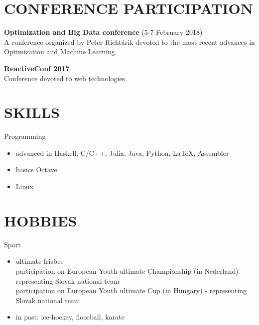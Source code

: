 \documentclass[margin, 10pt]{res} %
\begin{document}
\begin{resume}
		
		\section{CONFERENCE PARTICIPATION}
		\textbf{Optimization and Big Data conference} (5-7 February 2018)\\
		A conference organized by Peter Richtárik devoted to the most recent advances in Optimization and Machine Learning.
		
		\textbf{ReactiveConf 2017}\\
		Conference devoted to web technologies.
		
		
		\section{SKILLS}
		
		Programming
		\begin{itemize} \itemsep -2pt
			\item advanced in Haskell, C/C++, Julia, Java, Python, \LaTeX, Assembler
			\item basics Octave
			\item Linux
		\end{itemize}
		
		\section{HOBBIES} 
		Sport
		\begin{itemize} \itemsep -2pt
			\item ultimate frisbee \\
			participation on European Youth ultimate Championship (in Nederland) - representing Slovak national team\\
			participation on European Youth ultimate Cup (in Hungary) - representing Slovak national team
			\item in past: ice-hockey, floorball, karate
		\end{itemize}
		
		
	\end{resume}
\end{document}
